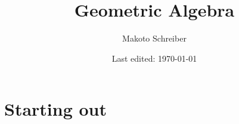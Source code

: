\documentclass[twocolumn]{scrartcl}
\title{Geometric Algebra}
\date{Last edited: \today}
\author{Makoto Schreiber}
\begin{document}
\maketitle
\tableofcontents

\section{Starting out}

\end{document}
